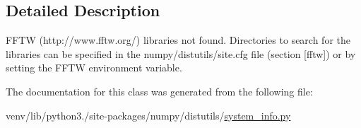 \subsection{Detailed Description}
\begin{DoxyVerb}FFTW (http://www.fftw.org/) libraries not found.
Directories to search for the libraries can be specified in the
numpy/distutils/site.cfg file (section [fftw]) or by setting
the FFTW environment variable.\end{DoxyVerb}
 

The documentation for this class was generated from the following file\+:\begin{DoxyCompactItemize}
\item 
venv/lib/python3./site-\/packages/numpy/distutils/\hyperlink{system__info_8py}{system\+\_\+info.\+py}\end{DoxyCompactItemize}
